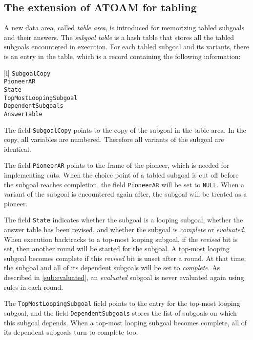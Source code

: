 \documentclass{tlp}
\begin{document}
\subsection{The extension of ATOAM for tabling}
A new data area, called {\it table area}, is introduced for memorizing tabled subgoals and their answers. The {\it subgoal table} is a hash table that stores all the tabled subgoals encountered in execution. For each tabled subgoal and its variants, there is an entry in the table, which is a record containing the following information:
\begin{center}
\begin{oldtabular}{|l|} \oldhline
{\tt SubgoalCopy}  \\ \oldhline
{\tt PioneerAR} \\ \oldhline
{\tt State} \\ \oldhline
{\tt TopMostLoopingSubgoal} \\ \oldhline
{\tt DependentSubgoals}  \\ \oldhline
{\tt AnswerTable} \\ \oldhline
\end{oldtabular}
\end{center}

\noindent
The field {\tt SubgoalCopy} points to the copy of the subgoal in the table area. In the copy, all variables are numbered. Therefore all variants of the subgoal are identical. 

The field {\tt PioneerAR} points to the frame of the pioneer, which is needed for implementing cuts. When the choice point of a tabled subgoal is cut off before the subgoal reaches completion, the field {\tt PioneerAR} will be set to {\tt NULL}. When a variant of the subgoal is encountered again after, the subgoal will be treated as a pioneer.

The field {\tt State} indicates whether the subgoal is a looping subgoal, whether the answer table has been revised, and whether the subgoal is {\it complete} or {\it evaluated}. When execution backtracks to a top-most looping subgoal, if the {\it revised} bit is set, then another round will be started for the subgoal. A top-most looping subgoal becomes complete if this {\it revised} bit is unset after a round. At that time, the subgoal and all of its dependent subgoals will be set to {\it complete}. As described in \ref{sub:evaluated}, an {\it evaluated} subgoal is never evaluated again using rules in each round.

The {\tt TopMostLoopingSubgoal} field points to the entry for the top-most looping subgoal, and the field {\tt DependentSubgoals} stores the list of subgoals on which this subgoal depends. When a top-most looping subgoal becomes complete, all of its dependent subgoals turn to complete too. 
\end{document}

